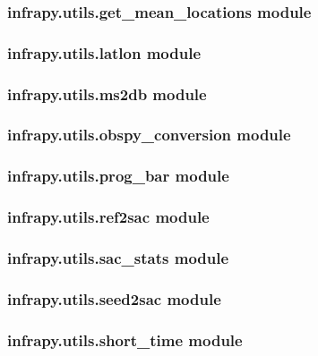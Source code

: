 \documentclass[letterpaper,10pt,english]{sphinxmanual}
\begin{document}
\subsubsection{infrapy.utils.get\_mean\_locations module}
\label{\detokenize{infrapy.utils:infrapy-utils-get-mean-locations-module}}

\subsubsection{infrapy.utils.latlon module}
\label{\detokenize{infrapy.utils:infrapy-utils-latlon-module}}

\subsubsection{infrapy.utils.ms2db module}
\label{\detokenize{infrapy.utils:infrapy-utils-ms2db-module}}

\subsubsection{infrapy.utils.obspy\_conversion module}
\label{\detokenize{infrapy.utils:infrapy-utils-obspy-conversion-module}}

\subsubsection{infrapy.utils.prog\_bar module}
\label{\detokenize{infrapy.utils:infrapy-utils-prog-bar-module}}

\subsubsection{infrapy.utils.ref2sac module}
\label{\detokenize{infrapy.utils:infrapy-utils-ref2sac-module}}

\subsubsection{infrapy.utils.sac\_stats module}
\label{\detokenize{infrapy.utils:infrapy-utils-sac-stats-module}}

\subsubsection{infrapy.utils.seed2sac module}
\label{\detokenize{infrapy.utils:infrapy-utils-seed2sac-module}}

\subsubsection{infrapy.utils.short\_time module}
\label{\detokenize{infrapy.utils:infrapy-utils-short-time-module}}
\end{document}
